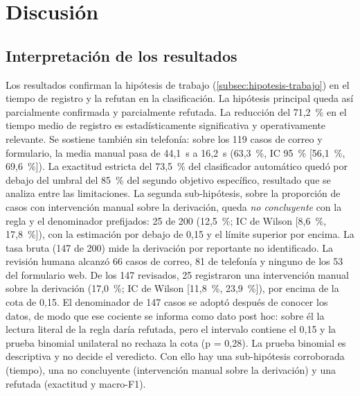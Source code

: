 \section{Discusión}\label{sec:discusion}

\subsection{Interpretación de los resultados}\label{subsec:interpretacion-resultados}

Los resultados confirman la hipótesis de trabajo (\autoref{subsec:hipotesis-trabajo}) en el tiempo de registro y la refutan en la clasificación. La hipótesis principal queda así parcialmente confirmada y parcialmente refutada. La reducción del 71,2~\% en el tiempo medio de registro es estadísticamente significativa y operativamente relevante. Se sostiene también sin telefonía: sobre los 119 casos de correo y formulario, la media manual pasa de 44,1~s a 16,2~s (63,3~\%, IC 95~\% [56,1~\%, 69,6~\%]). La exactitud estricta del 73,5~\% del clasificador automático quedó por debajo del umbral del 85~\% del segundo objetivo específico, resultado que se analiza entre las limitaciones. La segunda sub-hipótesis, sobre la proporción de casos con intervención manual sobre la derivación, queda \emph{no concluyente} con la regla y el denominador prefijados: 25 de 200 (12,5~\%; IC de Wilson [8,6~\%, 17,8~\%]), con la estimación por debajo de 0,15 y el límite superior por encima. La tasa bruta (147 de 200) mide la derivación por reportante no identificado. La revisión humana alcanzó 66 casos de correo, 81 de telefonía y ninguno de los 53 del formulario web. De los 147 revisados, 25 registraron una intervención manual sobre la derivación (17,0~\%; IC de Wilson [11,8~\%, 23,9~\%]), por encima de la cota de 0,15. El denominador de 147 casos se adoptó después de conocer los datos, de modo que ese cociente se informa como dato post hoc: sobre él la lectura literal de la regla daría refutada, pero el intervalo contiene el 0,15 y la prueba binomial unilateral no rechaza la cota (p = 0,28). La prueba binomial es descriptiva y no decide el veredicto. Con ello hay una sub-hipótesis corroborada (tiempo), una no concluyente (intervención manual sobre la derivación) y una refutada (exactitud y macro-F1).

